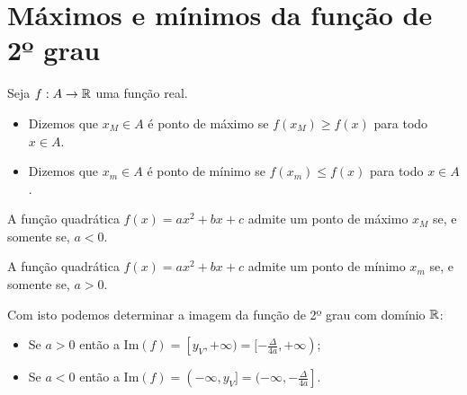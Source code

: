 
\section{Máximos e mínimos da função de 2º grau}

    Seja $f:A\to \mathbb{R}$ uma função real.
\begin{itemize}
    \item Dizemos que $x_M\in A$ é ponto de máximo se $f(x_M)\geqslant f(x)$ para todo $x\in A$.

    \item Dizemos que $x_m\in A$ é ponto de mínimo se $f(x_m)\leqslant f(x)$ para todo $x\in A$.
\end{itemize}

\begin{teo}
    A função quadrática $f(x)=ax^2+bx+c$ admite um ponto de máximo $x_M$ se, e somente se, $a<0$.
\end{teo}

\begin{teo}
    A função quadrática $f(x)=ax^2+bx+c$ admite um ponto de mínimo $x_m$ se, e somente se, $a>0$.
\end{teo}

Com isto podemos determinar a imagem da função de 2º grau com domínio $\mathbb{R}$:
\begin{itemize}
    \item Se $a>0$ então a $\mathrm{Im}(f)=\left[y_V,+\infty)=[-\frac{\Delta}{4a},+\infty\right)$;
    \item Se $a<0$ então a $\mathrm{Im}(f)=\left(-\infty, y_V]=(-\infty,-\frac{\Delta}{4a}\right]$.
\end{itemize}

